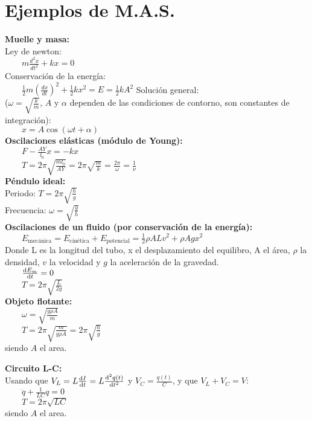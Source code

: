 \documentclass[a4paper,landscape,10pt]{cheatsheet}
\begin{document}
\section{Ejemplos de M.A.S.}
\textbf{Muelle y masa:}\\
Ley de newton:\\
$\qquad m\frac{d^2x}{dt^2}+kx=0$\\
Conservación de la energía:\\
$\qquad\frac{1}{2}m\left(\frac{dx}{dt}\right)^2 + \frac{1}{2}kx^2 = E = \frac{1}{2}kA^2$
Solución general:\\
($\omega=\sqrt{\frac{k}{m}}$, $A$ y $\alpha$ dependen de las condiciones de contorno, son constantes de integración):\\
$\qquad x=A\cos\left(\omega t+\alpha\right)$\\
\textbf{Oscilaciones elásticas (módulo de Young):}\\
$\qquad F-\frac{AY}{l_0}x = -kx$\\
$\qquad T=2\pi\sqrt{\frac{ml_0}{AY}}=2\pi\sqrt{\frac{m}{k}}=\frac{2\pi}{\omega}=\frac{1}{\nu}$\\
\textbf{Péndulo ideal:}\\
Periodo: $T=2\pi\sqrt{\frac{h}{g}}$\\
Frecuencia: $\omega=\sqrt{\frac{g}{h}}$\\
\textbf{Oscilaciones de un fluido (por conservación de la energía):}\\
$\qquad E_{\text{mecánica}}=E_{\text{cinética}}+E_{\text{potencial}} = \frac{1}{2}\rho ALv^2 + \rho Agx^2$\\
Donde L es la longitud del tubo, x el desplazamiento del equilibro, A el área, $\rho$ la densidad, $v$ la velocidad y $g$ la aceleración de la gravedad.\\
$\qquad \derivative{E_m}{t} = 0$\\
$\qquad T=2\pi\sqrt{\frac{L}{2g}}$\\

\textbf{Objeto flotante:}\\
$\qquad\omega=\sqrt{\frac{g\rho A}{m}}$\\
$\qquad T=2\pi\sqrt{\frac{m}{g\rho A}}=2\pi\sqrt{\frac{h}{g}}$\\
siendo $A$ el area.

\textbf{Circuito L-C:}\\
Usando que $V_L=L\derivative{I}{t}=L\derivative{^2q(t)}{t^2}$ y $V_C=\frac{q(t)}{C}$, y que $V_L+V_C=V$:\\
$\qquad \ddot{q} + \frac{1}{LC}q = 0$\\
$\qquad T=2\pi\sqrt{LC}$\\
siendo $A$ el area.
\end{document}
